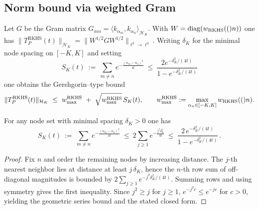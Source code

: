 \subsection{Norm bound via weighted Gram}
Let $G$ be the Gram matrix $G_{mn}=\langle k_{\alpha_m},k_{\alpha_n}\rangle_{\mathcal H_K}$. With $W=\mathrm{diag}(w_{\mathrm{RKHS}}(()n))$ one has $\|T_P^{\mathrm{RKHS}}(t)\|_{\mathcal H_K}=\|W^{1/2}GW^{1/2}\|_{\ell^2\to\ell^2}$. Writing $\delta_K$ for the minimal node spacing on $[-K,K]$ and setting
\begin{equation}\label{eq:RKHS_contraction-formula-7}
S_K(t)\ :=\ \sum_{m\ne n} e^{-\frac{(\alpha_m-\alpha_n)^2}{4t}}\ \le\ \frac{2e^{-\delta_K^2/(4t)}}{1-e^{-\delta_K^2/(4t)}}
\end{equation}
one obtains the Gershgorin--type bound
\begin{equation}\label{rkhs:eq:rkhs-norm}
\|T_P^{\mathrm{RKHS}}(t)\|_{\mathcal H_K}\ \le\ w_{\max}^{\mathrm{RKHS}}\ +\ \sqrt{w_{\max}^{\mathrm{RKHS}}}\, S_K(t),\qquad w_{\max}^{\mathrm{RKHS}}:=\max_{\alpha_n\in[-K,K]} w_{\mathrm{RKHS}}(()n).
\end{equation}

\begin{lemma}\label{rkhs:lem:geom-SK}
For any node set with minimal spacing $\delta_K>0$ one has
\begin{equation}\label{eq:RKHS_contraction-formula-4}
 S_K(t)\ :=\ \sum_{m\ne n} e^{-\frac{(\alpha_m-\alpha_n)^2}{4t}}
 \ \le\ 2\sum_{j\ge1} e^{-\frac{j^2\delta_K^2}{4t}}
 \ \le\ \frac{2\,e^{-\delta_K^2/(4t)}}{1-e^{-\delta_K^2/(4t)}}\,.
\end{equation}
\end{lemma}
\label{a3:lem:prime-L2-trace}
\begin{proof}
Fix $n$ and order the remaining nodes by increasing distance. The $j$-th nearest neighbor lies at distance at least $j\,\delta_K$, hence the $n$-th row sum of off-diagonal magnitudes is bounded by $2\sum_{j\ge1} e^{-j^2\delta_K^2/(4t)}$. Summing rows and using symmetry gives the first inequality. Since $j^2\ge j$ for $j\ge1$, $e^{-j^2 c}\le e^{-jc}$ for $c>0$, yielding the geometric series bound and the stated closed form.
\end{proof}

